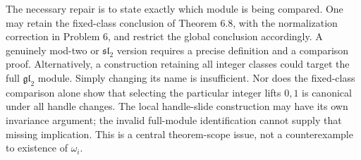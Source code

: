 \documentclass[10pt]{article}
\begin{document}
The necessary repair is to state exactly which module is being compared. One may retain the fixed-class conclusion of Theorem 6.8, with the normalization correction in Problem 6, and restrict the global conclusion accordingly. A genuinely mod-two or \(\mathfrak{sl}_2\) version requires a precise definition and a comparison proof. Alternatively, a construction retaining all integer classes could target the full \(\mathfrak{gl}_2\) module. Simply changing its name is insufficient. Nor does the fixed-class comparison alone show that selecting the particular integer lifts \(0,1\) is canonical under all handle changes. The local handle-slide construction may have its own invariance argument; the invalid full-module identification cannot supply that missing implication. This is a central theorem-scope issue, not a counterexample to existence of \(\omega_i\).\par
\end{document}
